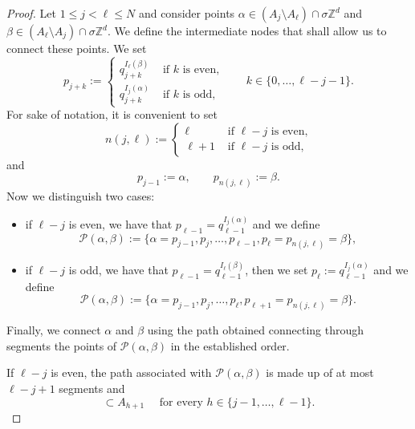 \documentclass{article}
\theoremstyle{plain}
\theoremstyle{definition}
\def\ZZ{{\mathbb Z}}
\newcommand{\s}{\sigma}
\numberwithin{equation}{section}
\begin{document}
\begin{proof}
Let $1\leq j<\ell\leq N$ and consider points $\alpha\in (A_j\setminus A_\ell)\cap\s\ZZ^d$ and $\beta \in (A_\ell\setminus A_j)\cap\s\ZZ^d$. We define the intermediate nodes that shall allow us to connect these points. We set
 \begin{equation*}
     p_{j+k}:=\begin{cases}
         q_{j+k}^{I_\ell(\beta)} & \text{ if } k \text{ is even,}\\[5pt]
         q_{j+k}^{I_j(\alpha)} & \text{ if } k \text{ is odd,}
     \end{cases}
     \qquad k\in\{0,\dots,\ell-j-1\}.
 \end{equation*}
For sake of notation, it is convenient to set 
 \begin{equation*}
n(j,\ell):= \begin{cases}
        \ell & \text{ if } \ell-j \text{ is even,} \\
     \ell+1 & \text{ if } \ell-j \text{ is odd,}
    \end{cases}   
\end{equation*}
and 
\begin{equation*}
    p_{j-1}:=\alpha, \qquad p_{n(j,\ell)}:=\beta.
\end{equation*}
Now we distinguish two cases:
\begin{itemize}
 \item if $\ell-j$ is even, we have that $p_{\ell-1}=q_{\ell-1}^{I_j(\alpha)}$ and we define
 \begin{equation*}
     \mathcal P(\alpha,\beta):=
        \{\alpha=p_{j-1}, p_j, \dots, p_{\ell-1}, p_\ell=p_{n(j,\ell)}=\beta\}, 
 \end{equation*}
\item if $\ell-j$ is odd, we have that $p_{\ell-1}=q_{\ell-1}^{I_\ell(\beta)}$, then we set $p_\ell:=q_{\ell-1}^{I_j(\alpha)}$ and we define
\begin{equation*}
    \mathcal P(\alpha,\beta):=\{\alpha=p_{j-1}, p_j, \dots, p_{\ell}, p_{\ell+1}=p_{n(j,\ell)}=\beta\} .
\end{equation*}   
 \end{itemize}
Finally, we connect $\alpha$ and $\beta$ using the path obtained connecting through segments the points of $\mathcal P(\alpha,\beta)$ in the established order.

If $\ell-j$ is even, the path associated with $\mathcal P(\alpha,\beta)$ is made up of at most $\ell-j+1$ segments and 
\begin{equation*}
 [p_h,p_{h+1}]\subset A_{h+1} \quad \text{ for every } h\in\{j-1,\dots, \ell-1\}.
\end{equation*}


\end{proof}
\end{document}

